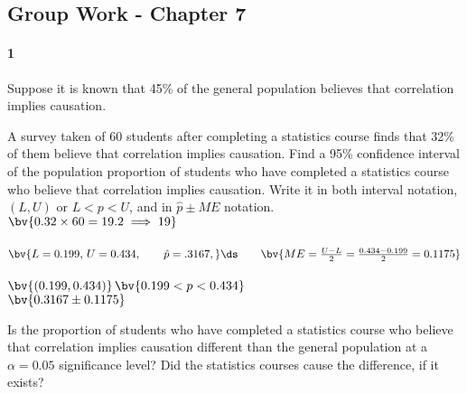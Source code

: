 \documentclass{article}
\begin{document}
\begin{flushleft}
\section*{Group Work - Chapter 7}
\paragraph{1} Suppose it is known that 45\% of the general population believes that correlation implies causation.
\begin{enumalpha}
\item A survey taken of 60 students after completing a statistics course finds that 32\% of them believe that correlation implies causation. Find a 95\% confidence interval of the population proportion of students who have completed a statistics course who believe that correlation implies causation. Write it in both interval notation, $(L, U)$ or $L < p < U$, and in $\hat p \pm ME$ notation.\\
\medskip
{}$\bv{0.32 \times 60 = 19.2 \implies 19}$\\
\medskip
{}\\
\medskip
$\bv{L = 0.199,\, U=0.434, \qquad \hat p= .3167,}\ds\qquad \bv{ME = \frac{U - L}{2} = \frac{0.434 - 0.199}{2} = 0.1175}$\\
\bigskip
{}\\$\bv{(0.199, 0.434)}$$\bv{0.199 < p < 0.434}$\\$\bv{0.3167 \pm 0.1175}$\\
\vspace{0.5in}

\item Is the proportion of students who have completed a statistics course who believe that correlation implies causation different than the general population at a $\alpha = 0.05$ significance level? Did the statistics courses cause the difference, if it exists?\\
\medskip
{}\\
\medskip
{}


\end{enumalpha}
\end{flushleft}
\end{document}

